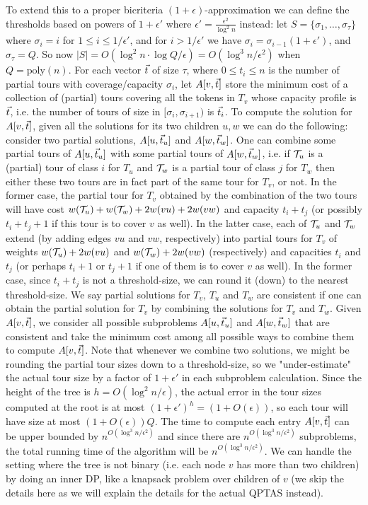 \documentclass[twoside,leqno]{article}
\newcommand{\eps}{\epsilon}
\newcommand{\poly}{\text{poly}}
\begin{document}
To extend this to a proper bicriteria $(1+\epsilon)$-approximation we can define the thresholds based on powers of 
$1+\epsilon'$ where $\epsilon'=\frac{\epsilon^2}{\log^2 n}$ instead: let 
$S = \{\sigma_1, \ldots, \sigma_\tau \}$ where $\sigma_i=i$ for $1\leq i\leq 1/\epsilon'$, and 
for $i>1/\epsilon'$ we have $\sigma_i = \sigma_{i-1}(1 + \eps')$, and $\sigma_\tau = Q$. So now 
$|S|=O(\log^2 n\cdot\log Q/\epsilon)=O(\log^3 n/\epsilon^2)$ when $Q = \poly(n)$. For each vector $\vec{t}$ of size $\tau$, where $0\leq t_i\leq n$
is the number of partial tours with coverage/capacity $\sigma_i$, let $A[v,\vec{t}]$ store the minimum cost of a collection of
(partial) tours covering all the tokens in $T_v$ whose capacity profile is $\vec{t}$, i.e. the number of
tours of size in $[\sigma_i,\sigma_{i+1})$ is $\vec{t}_i$. To compute the solution for $A[v,\vec{t}]$, 
given all the solutions for its two children $u,w$ we can do the following: consider two partial solutions,  
$A[u,\vec{t}_u]$ and $A[w,\vec{t}_w]$. One can combine some partial tours of $A[u,\vec{t}_u]$ with some partial tours of $A[w,\vec{t}_w]$,
i.e. if ${\cal T}_u$  is a (partial) tour of class $i$ for $T_u$ and ${\cal T}_w$ is a partial tour of class $j$ for $T_w$
then either these two tours are in fact part of the same tour for $T_v$, or not. In the former case, the partial tour
for $T_v$ obtained by the combination of the two tours will have cost $w({\cal T}_u)+w({\cal T}_w)+2w(vu)+2w(vw)$ and capacity
$t_i+t_j$ (or possibly $t_i+t_j+1$ if this tour is to cover $v$ as well). 
In the latter case, each of ${\cal T}_u$ and ${\cal T}_w$ extend (by adding edges $vu$ and $vw$, respectively) into
partial tours for $T_v$ of weights $w({\cal  T}_u)+2w(vu)$ and $w({\cal  T}_w)+2w(vw)$ (respectively)  and capacities $t_i$
and $t_j$ (or perhaps $t_i+1$ or $t_j+1$ if one of them is to cover $v$ as well). In the former case, since $t_i+t_j$ is not
a threshold-size, we can round it (down) to the nearest threshold-size. We say partial solutions for $T_v$, $T_u$ and $T_w$
are consistent if one can obtain the partial solution for $T_v$ by combining the solutions for $T_v$ and $T_w$. Given
$A[v,\vec{t}]$, we consider all possible subproblems $A[u,\vec{t}_u]$ and $A[w,\vec{t}_w]$ that are consistent and take the minimum cost among
all possible ways to combine them to compute $A[v,\vec{t}]$. 
Note that whenever we combine two solutions, we might be rounding
the partial tour sizes down to a threshold-size, so we "under-estimate" the actual tour size by a factor
of $1+\epsilon'$ in each subproblem calculation. Since the height of the tree is $h=O(\log^2 n/\epsilon)$, the actual error in the tour sizes computed at the root is at most $(1+\epsilon')^h=(1+O(\epsilon))$, so each tour will have size at most $(1+O(\epsilon))Q$. The time to compute each entry $A[v,\vec{t}]$ can be upper bounded
by $n^{O(\log^3 n/\epsilon^2)}$ and since there are $n^{O(\log^3 n/\epsilon^2)}$ subproblems, 
the total running time of the algorithm will be $n^{O(\log^3 n/\epsilon^2)}$. We can handle the setting where the tree is not binary  (i.e. each node $v$ has more than two children) by doing an inner DP, like a knapsack problem over children of $v$
(we skip the details here as we will explain the details for the actual QPTAS instead). 
\end{document}
